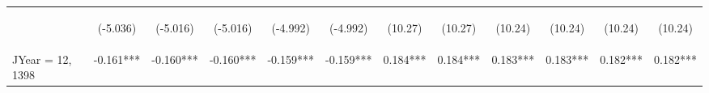\documentclass[]{article}
\begin{document}
\begin{center}
\begin{tabular}{lccccccccccc}
        \vspace{4pt}     & \begin{footnotesize}(-5.036)\end{footnotesize} & \begin{footnotesize}(-5.016)\end{footnotesize} & \begin{footnotesize}(-5.016)\end{footnotesize} & \begin{footnotesize}(-4.992)\end{footnotesize} & \begin{footnotesize}(-4.992)\end{footnotesize} & \begin{footnotesize}(10.27)\end{footnotesize}   & \begin{footnotesize}(10.27)\end{footnotesize}   & \begin{footnotesize}(10.24)\end{footnotesize}  & \begin{footnotesize}(10.24)\end{footnotesize}  & \begin{footnotesize}(10.24)\end{footnotesize}  & \begin{footnotesize}(10.24)\end{footnotesize}  \\
        JYear = 12, 1398 & -0.161***                                      & -0.160***                                      & -0.160***                                      & -0.159***                                      & -0.159***                                      & 0.184***                                        & 0.184***                                        & 0.183***                                       & 0.183***                                       & 0.182***                                       & 0.182***                                       \\

\end{tabular}
\end{center}
\end{document}
